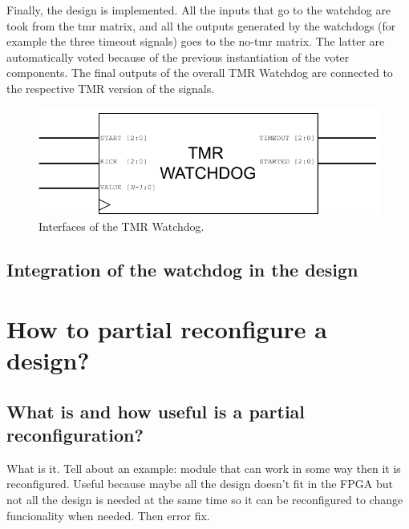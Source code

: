 Finally, the design is implemented. All the inputs that go to the watchdog are took from the tmr matrix, and all the outputs generated by the watchdogs (for example the three timeout signals) goes to the no-tmr matrix. The latter are automatically voted because of the previous instantiation of the voter components. The final outputs of the overall TMR Watchdog are connected to the respective TMR version of the signals.

\begin{figure}[H]
\centering
\includegraphics[width=0.7\linewidth]{images/chapter4/wd_tmr.pdf}
\caption{Interfaces of the TMR Watchdog.}
\label{fig:wd_tmr}
\end{figure}


\subsection{Integration of the watchdog in the design}


\section{How to partial reconfigure a design?}
\subsection{What is and how useful is a partial reconfiguration?}

What is it. Tell about an example: module that can work in some way then it is reconfigured. Useful because maybe all the design doesn't fit in the FPGA but not all the design is needed at the same time so it can be reconfigured to change funcionality when needed. %
Then error fix.

